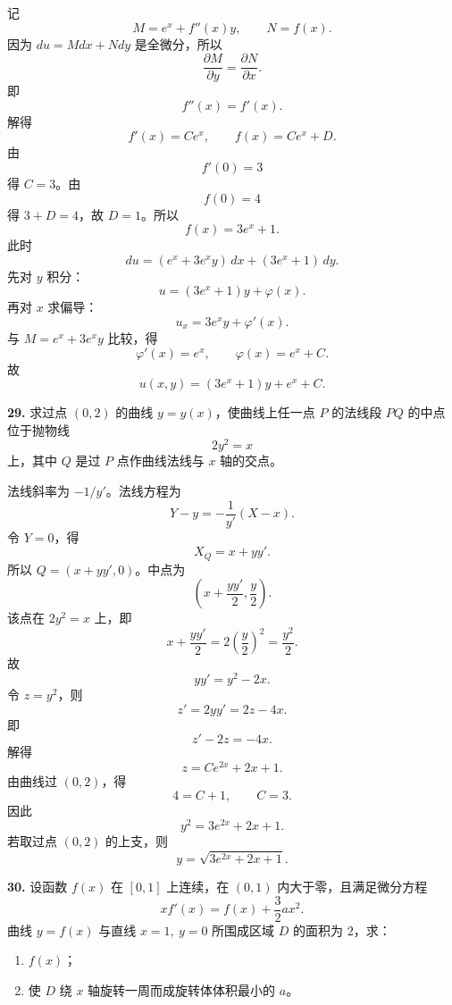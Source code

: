 \begin{solutionblock}
记
\[
M=e^x+f''(x)y,\qquad N=f(x).
\]
因为 \(du=Mdx+Ndy\) 是全微分，所以
\[
\frac{\partial M}{\partial y}=\frac{\partial N}{\partial x}.
\]
即
\[
f''(x)=f'(x).
\]
解得
\[
f'(x)=Ce^x,\qquad f(x)=Ce^x+D.
\]
由
\[
f'(0)=3
\]
得 \(C=3\)。由
\[
f(0)=4
\]
得 \(3+D=4\)，故 \(D=1\)。所以
\[
\boxed{f(x)=3e^x+1}.
\]
此时
\[
du=(e^x+3e^xy)\,dx+(3e^x+1)\,dy.
\]
先对 \(y\) 积分：
\[
u=(3e^x+1)y+\varphi(x).
\]
再对 \(x\) 求偏导：
\[
u_x=3e^xy+\varphi'(x).
\]
与 \(M=e^x+3e^xy\) 比较，得
\[
\varphi'(x)=e^x,\qquad \varphi(x)=e^x+C.
\]
故
\[
\boxed{u(x,y)=(3e^x+1)y+e^x+C}.
\]
\end{solutionblock}

\begin{problemblock}
\textbf{29.} 求过点 \((0,2)\) 的曲线 \(y=y(x)\)，使曲线上任一点 \(P\) 的法线段 \(PQ\) 的中点位于抛物线
\[
2y^2=x
\]
上，其中 \(Q\) 是过 \(P\) 点作曲线法线与 \(x\) 轴的交点。
\end{problemblock}

\begin{solutionblock}
法线斜率为 \(-1/y'\)。法线方程为
\[
Y-y=-\frac1{y'}(X-x).
\]
令 \(Y=0\)，得
\[
X_Q=x+yy'.
\]
所以 \(Q=(x+yy',0)\)。中点为
\[
\left(x+\frac{yy'}2,\frac y2\right).
\]
该点在 \(2y^2=x\) 上，即
\[
x+\frac{yy'}2=2\left(\frac y2\right)^2=\frac{y^2}{2}.
\]
故
\[
yy'=y^2-2x.
\]
令 \(z=y^2\)，则
\[
z'=2yy'=2z-4x.
\]
即
\[
z'-2z=-4x.
\]
解得
\[
z=Ce^{2x}+2x+1.
\]
由曲线过 \((0,2)\)，得
\[
4=C+1,\qquad C=3.
\]
因此
\[
\boxed{y^2=3e^{2x}+2x+1}.
\]
若取过点 \((0,2)\) 的上支，则
\[
\boxed{y=\sqrt{3e^{2x}+2x+1}}.
\]
\end{solutionblock}

\begin{problemblock}
\textbf{30.} 设函数 \(f(x)\) 在 \([0,1]\) 上连续，在 \((0,1)\) 内大于零，且满足微分方程
\[
xf'(x)=f(x)+\frac32ax^2.
\]
曲线 \(y=f(x)\) 与直线 \(x=1,\ y=0\) 所围成区域 \(D\) 的面积为 \(2\)，求：
\begin{enumerate}
\item \(f(x)\)；
\item 使 \(D\) 绕 \(x\) 轴旋转一周而成旋转体体积最小的 \(a\)。
\end{enumerate}
\end{problemblock}

